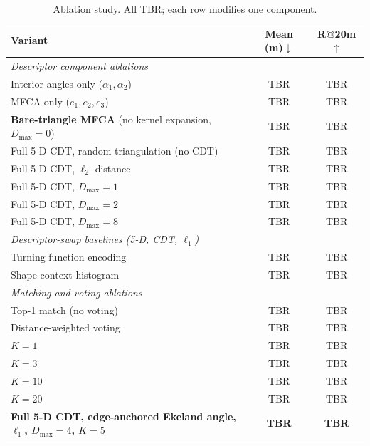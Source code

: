 \documentclass[10pt]{article}
\theoremstyle{plain}
\theoremstyle{definition}
\begin{document}
\begin{table}[htbp]
\caption{Ablation study. All TBR; each row modifies one component.}
\label{tab:ablation}
\centering\small
\setlength{\tabcolsep}{4pt}
\begin{tabular}{lcc}
\toprule
\textbf{Variant} & \textbf{Mean (m)$\downarrow$} & \textbf{R@20m$\uparrow$} \\
\midrule
\multicolumn{3}{l}{\textit{Descriptor component ablations}} \\
Interior angles only ($\alpha_1,\alpha_2$)                      & TBR & TBR \\
MFCA only ($e_1,e_2,e_3$)                                       & TBR & TBR \\
\textbf{Bare-triangle MFCA} (no kernel expansion, $D_{\max}=0$) & TBR & TBR \\
Full 5-D CDT, random triangulation (no CDT)                     & TBR & TBR \\
Full 5-D CDT, $\ell_2$ distance                                       & TBR & TBR \\
Full 5-D CDT, $D_{\max}=1$                                       & TBR & TBR \\
Full 5-D CDT, $D_{\max}=2$                                       & TBR & TBR \\
Full 5-D CDT, $D_{\max}=8$                                       & TBR & TBR \\
\midrule
\multicolumn{3}{l}{\textit{Descriptor-swap baselines (5-D, CDT, $\ell_1$)}} \\
Turning function encoding~\cite{arkin1991efsd}                  & TBR & TBR \\
Shape context histogram~\cite{belongie2002shape}                & TBR & TBR \\
\midrule
\multicolumn{3}{l}{\textit{Matching and voting ablations}} \\
Top-1 match (no voting)                                         & TBR & TBR \\
Distance-weighted voting                                        & TBR & TBR \\
$K=1$                                                           & TBR & TBR \\
$K=3$                                                           & TBR & TBR \\
$K=10$                                                          & TBR & TBR \\
$K=20$                                                          & TBR & TBR \\
\midrule
\rowcolor{ours}
\textbf{Full 5-D CDT, edge-anchored Ekeland angle, $\ell_1$, $D_{\max}=4$, $K=5$}
  & \textbf{TBR} & \textbf{TBR} \\
\bottomrule
\end{tabular}
\end{table}
\end{document}
